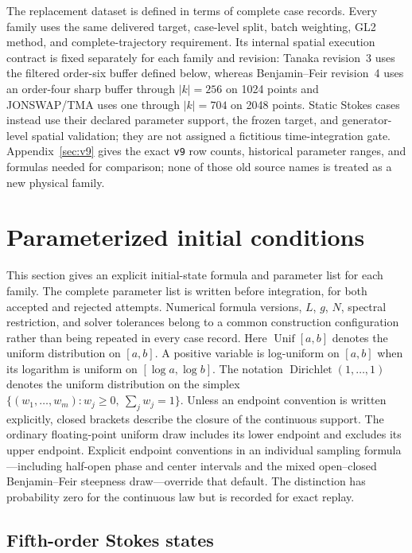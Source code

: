 \documentclass[11pt]{article}
\begin{document}
The replacement dataset is defined in terms of complete case records.  Every
family uses the same delivered target, case-level split, batch weighting, GL2
method, and complete-trajectory requirement.  Its internal spatial execution
contract is fixed separately for each family and revision: Tanaka revision~3
uses the filtered order-six buffer defined below, whereas Benjamin--Feir
revision~4 uses an order-four sharp buffer through \(|k|=256\) on 1024
points and JONSWAP/TMA uses one through \(|k|=704\) on 2048 points.  Static Stokes cases instead use
their declared parameter support, the frozen target, and generator-level
spatial validation; they are not assigned a fictitious time-integration gate.
Appendix~\ref{sec:v9} gives the exact
\texttt{v9} row counts, historical parameter ranges, and formulas needed for
comparison; none of those old source names is treated as a new physical
family.
\section{Parameterized initial conditions}
\label{sec:families}

This section gives an explicit initial-state formula and parameter list for
each family.  The complete parameter list is written before integration, for both
accepted and rejected attempts.  Numerical formula versions, $L$, $g$, $N$,
spectral restriction, and solver tolerances belong to a common construction
configuration rather than being repeated in every case record.
Here $\operatorname{Unif}[a,b]$ denotes the uniform distribution on
$[a,b]$.  A positive variable is log-uniform on $[a,b]$ when its logarithm
is uniform on $[\log a,\log b]$.  The notation
$\operatorname{Dirichlet}(1,\ldots,1)$ denotes the uniform distribution on
the simplex $\{(w_1,\ldots,w_m):w_j\geq0,\ \sum_jw_j=1\}$.
Unless an endpoint convention is written explicitly, closed brackets describe
the closure of the continuous support.  The ordinary floating-point uniform
draw includes its lower endpoint and excludes its upper endpoint.  Explicit
endpoint conventions in an individual sampling formula---including half-open
phase and center intervals and the mixed open--closed Benjamin--Feir steepness
draw---override that default.  The distinction has probability zero for the
continuous law but is recorded for exact replay.

\subsection{Fifth-order Stokes states}
\end{document}
